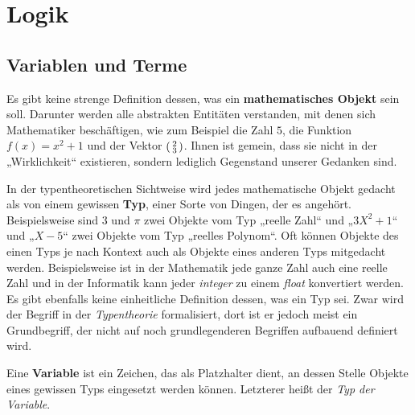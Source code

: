 

    

\chapter{Logik} \label{chap:logik}


\section{Variablen und Terme}

\begin{defin}  
    Es gibt keine strenge Definition dessen, was ein \textbf{mathematisches Objekt} sein soll. Darunter werden alle abstrakten Entitäten verstanden, mit denen sich Mathematiker beschäftigen, wie zum Beispiel die Zahl $5$, die Funktion $f(x)=x^2+1$ und der Vektor $\begin{psmallmatrix} 2 \\ 3 \end{psmallmatrix}$. Ihnen ist gemein, dass sie nicht in der „Wirklichkeit“ existieren, sondern lediglich Gegenstand unserer Gedanken sind.

    In der typentheoretischen Sichtweise wird jedes mathematische Objekt gedacht als von einem gewissen \textbf{Typ}, einer Sorte von Dingen, der es angehört. Beispielsweise sind $3$ und $\pi$ zwei Objekte vom Typ „reelle Zahl“ und „$3X^2+1$“ und „$X-5$“ zwei Objekte vom Typ „reelles Polynom“. Oft können Objekte des einen Typs je nach Kontext auch als Objekte eines anderen Typs mitgedacht werden. Beispielsweise ist in der Mathematik jede ganze Zahl auch eine reelle Zahl und in der Informatik kann jeder \emph{integer} zu einem \emph{float} konvertiert werden. Es gibt ebenfalls keine einheitliche Definition dessen, was ein Typ sei. Zwar wird der Begriff in der \emph{Typentheorie} formalisiert, dort ist er jedoch meist ein Grundbegriff, der nicht auf noch grundlegenderen Begriffen aufbauend definiert wird.
\end{defin}


\begin{defin}[Variable] \label{def:variable} 
    Eine \textbf{Variable} ist ein Zeichen, das als Platzhalter dient, an dessen Stelle Objekte eines gewissen Typs eingesetzt werden können. Letzterer heißt der \emph{Typ der Variable}.
\end{defin}


